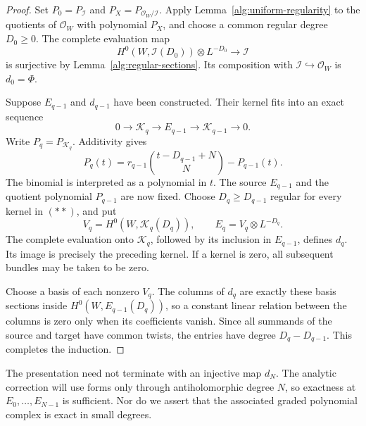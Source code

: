 \documentclass[11pt,reqno]{amsart}
\numberwithin{equation}{section}
\theoremstyle{definition}
\theoremstyle{remark}
\begin{document}
\begin{proof}
Set \(P_0=P_{\mathscr I}\) and
\(P_X=P_{\mathcal O_W/\mathscr I}\). Apply
Lemma~\ref{alg:uniform-regularity} to the quotients of
\(\mathcal O_W\) with polynomial \(P_X\), and choose a common regular
degree \(D_0\geq0\). The complete evaluation map
\[
 H^0(W,\mathscr I(D_0))\otimes L^{-D_0}
 \longrightarrow \mathscr I
\]
is surjective by Lemma~\ref{alg:regular-sections}. Its composition with
\(\mathscr I\hookrightarrow\mathcal O_W\) is \(d_0=\Phi\).

Suppose \(E_{q-1}\) and \(d_{q-1}\) have been constructed. Their kernel
fits into an exact sequence
\begin{equation}
 0\longrightarrow\mathscr K_q\longrightarrow E_{q-1}
 \longrightarrow\mathscr K_{q-1}\longrightarrow0.
 \label{alg:kernel-sequence}
\end{equation}
Write \(P_q=P_{\mathscr K_q}\). Additivity gives
\begin{equation}
 P_q(t)=r_{q-1}\binom{t-D_{q-1}+N}{N}-P_{q-1}(t).
 \label{alg:polynomial-recursion}
\end{equation}
The binomial is interpreted as a polynomial in \(t\). The source
\(E_{q-1}\) and the quotient polynomial \(P_{q-1}\) are now fixed.
Choose \(D_q\geq D_{q-1}\) regular for every kernel in
\((\ast\ast)\), and put
\[
 V_q=H^0(W,\mathscr K_q(D_q)),\qquad
 E_q=V_q\otimes L^{-D_q}.
\]
The complete evaluation onto \(\mathscr K_q\), followed by its inclusion
in \(E_{q-1}\), defines \(d_q\). Its image is precisely the preceding
kernel. If a kernel is zero, all subsequent bundles may be taken to be
zero.

Choose a basis of each nonzero \(V_q\). The columns of \(d_q\) are exactly
these basis sections inside
\(H^0(W,E_{q-1}(D_q))\), so a constant linear relation between the
columns is zero only when its coefficients vanish. Since all summands
of the source and target have common twists, the entries have degree
\(D_q-D_{q-1}\). This completes the induction.
\end{proof}

The presentation need not terminate with an injective map \(d_N\). The
analytic correction will use forms only through antiholomorphic degree
\(N\), so exactness at \(E_0,\ldots,E_{N-1}\) is sufficient. Nor do we
assert that the associated graded polynomial complex is exact in small
degrees.
\end{document}
